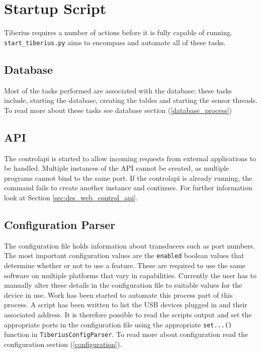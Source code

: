 \section{Startup Script}
\pagestyle{aidan}
\label{sec:misc_startup_script} %

Tiberius requires a number of actions before it is fully capable of running. \texttt{start\_tiberius.py} aims to encompass and automate all of these tasks. 
\newline
\subsection{Database}
Most of the tasks performed are associated with the database; these tasks include, starting the database, creating the tables and starting the sensor threads. To read more about these tasks see database section (\ref{database_process})

\subsection{API}
The \gls{controlapi} is started to allow incoming requests from external applications to be handled. Multiple instances of the API cannot be created, as multiple programs cannot bind to the same port. If the \gls{controlapi} is already running, the command fails to create another instance and continues. For further information look at Section \ref{sec:des_web_control_api}.

\subsection{Configuration Parser}
The configuration file holds information about transducers such as port numbers. The most important configuration values are the \texttt{enabled} boolean values that determine whether or not to use a feature. These are required to use the same software on multiple platforms that vary in capabilities.  Currently the user has to manually alter these details in the configuration file to suitable values for the device in use. Work has been started to automate this process part of this process. A script has been written to list the USB devices plugged in and their associated address. It is therefore possible to read the scripts output and set the appropriate ports in the configuration file using the appropriate \texttt{set...()} function in \texttt{TiberiusConfigParser}. To read more about configuration read the configuration section (\ref{configuration}).

